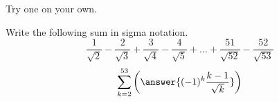 \documentclass{ximera}
\begin{document}
 
Try one on your own.
\begin{example}
 	Write the following sum in sigma notation.
 	\[ \frac{1}{\sqrt{2}} - \frac{2}{\sqrt{3}} + \frac{3}{\sqrt{4}} - \frac{4}{\sqrt{5}}+ \ldots + \frac{51}{\sqrt{52}} - \frac{52}{\sqrt{53}} \]
	\[ \sum_{k=2}^{53} \left(  \answer{(-1)^k\frac{k-1}{\sqrt{k}} } \right) \]

\end{example}
   

 
 
  
\end{document}
